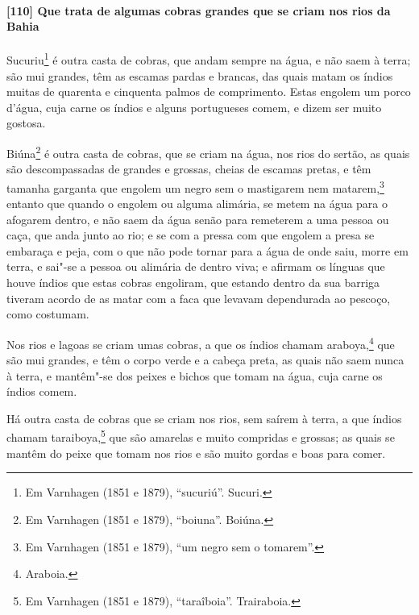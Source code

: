 \begin{linenumbers}
\paragraph{[110] Que trata de algumas cobras grandes que se criam nos rios da Bahia}\quad
Sucuriu\footnote{ Em Varnhagen (1851 e 1879), ``sucuriú''. Sucuri.} é outra casta de
cobras, que andam sempre na água, e não saem à terra; são mui grandes, têm as escamas
pardas e brancas, das quais matam os índios muitas de quarenta e cinquenta palmos de
comprimento. Estas engolem um porco d'água, cuja carne os índios e alguns portugueses
comem, e dizem ser muito gostosa.

Biúna\footnote{ Em Varnhagen (1851 e 1879), ``boiuna''. Boiúna.} é outra casta de cobras,
que se criam na água, nos rios do sertão, as quais são descompassadas de grandes e
grossas, cheias de escamas pretas, e têm tamanha garganta que engolem um negro sem o
mastigarem nem matarem,\footnote{ Em Varnhagen (1851 e 1879), ``um negro sem o
tomarem''.} entanto que quando o engolem ou alguma alimária, se metem na água para o
afogarem dentro, e não saem da água senão para remeterem a uma pessoa ou caça, que anda
junto ao rio; e se com a pressa com que engolem a presa se embaraça e peja, com o que não
pode tornar para a água de onde saiu, morre em terra, e sai"-se a pessoa ou alimária de
dentro viva; e afirmam os línguas que houve índios que estas cobras engoliram, que estando
dentro da sua barriga tiveram acordo de as matar com a faca que levavam dependurada ao
pescoço, como costumam.

Nos rios e lagoas se criam umas cobras, a que os índios chamam araboya,\footnote{
Araboia.} que são mui grandes, e têm o corpo verde e a cabeça preta, as quais não saem
nunca à terra, e mantêm"-se dos peixes e bichos que tomam na água, cuja carne os índios
comem.

Há outra casta de cobras que se criam nos rios, sem saírem à terra, a que índios chamam
taraiboya,\footnote{ Em Varnhagen (1851 e 1879), ``taraîboia''. Trairaboia.} que são
amarelas e muito compridas e grossas; as quais se mantêm do peixe que tomam nos rios e são
muito gordas e boas para comer.


\end{linenumbers}
